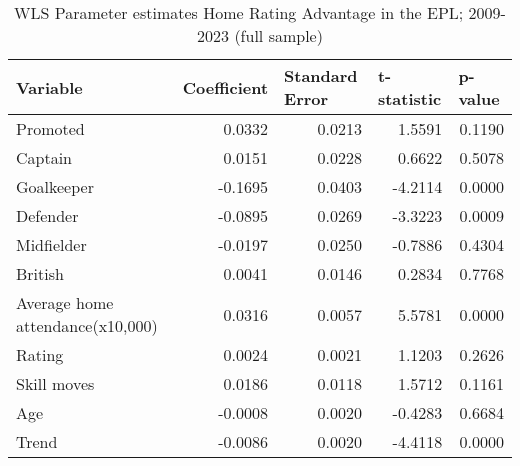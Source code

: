 \begin{table}[htbp]
    \begin{spacing}{1.5}
    \small
    \centering
    \caption{WLS Parameter estimates Home Rating Advantage in the EPL; 2009-2023 (full sample)}
    \begin{tabular}{lrrrr}
        \toprule
        \toprule
        Variable & \multicolumn{1}{l}{Coefficient} & \multicolumn{1}{l}{Standard Error} & \multicolumn{1}{l}{t-statistic} & \multicolumn{1}{l}{p-value} \\
        \midrule
        Promoted & 0.0332 & 0.0213 & 1.5591 & 0.1190 \\
        Captain & 0.0151 & 0.0228 & 0.6622 & 0.5078 \\
        Goalkeeper & -0.1695 & 0.0403 & -4.2114 & 0.0000 \\
        Defender & -0.0895 & 0.0269 & -3.3223 & 0.0009 \\
        Midfielder & -0.0197 & 0.0250 & -0.7886 & 0.4304 \\
        British & 0.0041 & 0.0146 & 0.2834 & 0.7768 \\
        Average home attendance(x10,000) & 0.0316 & 0.0057 & 5.5781 & 0.0000 \\
        Rating & 0.0024 & 0.0021 & 1.1203 & 0.2626 \\
        Skill moves & 0.0186 & 0.0118 & 1.5712 & 0.1161 \\
        Age   & -0.0008 & 0.0020 & -0.4283 & 0.6684 \\
        Trend & -0.0086 & 0.0020 & -4.4118 & 0.0000 \\
        \bottomrule
        \bottomrule
    \end{tabular}
    \end{spacing}
    \label{tab:wls_parameter_estimates_hra_full_sample}
\end{table}%

